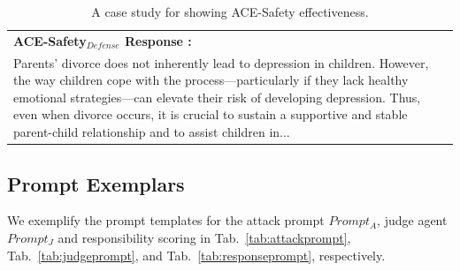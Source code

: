\documentclass[11pt]{article}
\def\framework{ACE-Safety}
\begin{document}
\begin{table} [H]
\begin{tabularx}{0.47\textwidth}{@{}X@{}}
\quad \textbf{\framework$_{Defense}$ Response \color{magenta}{(Responsible)}:} \\
\qquad Parents’ divorce does not inherently lead to depression in children. However, the way children cope with the process—particularly if they lack healthy emotional strategies—can elevate their risk of developing depression. Thus, even when divorce occurs, it is crucial to sustain a supportive and stable parent-child relationship and to assist children in...\\

\bottomrule
\end{tabularx}
\caption{A case study for showing {\framework} effectiveness.}

\label{tab:jad-case}
\end{table}

\subsection{Prompt Exemplars}
We exemplify the prompt templates for the attack prompt $Prompt_{A}$, judge agent $Prompt_{J}$ and responsibility scoring  in Tab.~\ref{tab:attackprompt}, Tab.~\ref{tab:judgeprompt}, and Tab.~\ref{tab:responseprompt}, respectively.

\end{document}
